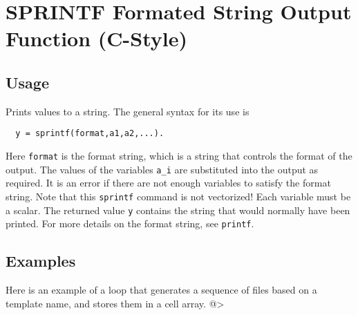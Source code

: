 \section{SPRINTF Formated String Output Function (C-Style)}

\subsection{Usage}

Prints values to a string.  The general syntax for its use is
\begin{verbatim}
  y = sprintf(format,a1,a2,...).
\end{verbatim}
Here \verb|format| is the format string, which is a string that
controls the format of the output.  The values of the variables
\verb|a_i| are substituted into the output as required.  It is
an error if there are not enough variables to satisfy the format
string.  Note that this \verb|sprintf| command is not vectorized!  Each
variable must be a scalar.  The returned value \verb|y| contains the
string that would normally have been printed. For
more details on the format string, see \verb|printf|.  
\subsection{Examples}

Here is an example of a loop that generates a sequence of files based on
a template name, and stores them in a cell array.
@>
